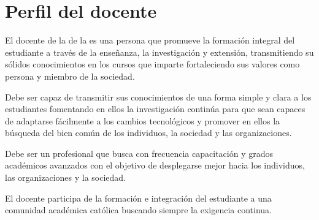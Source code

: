 \section{Perfil del docente}
El docente de la \SchoolFullName de la \University es una persona que promueve la formación 
integral del estudiante a través de la enseñanza, la investigación y extensión, 
transmitiendo su sólidos conocimientos en los cursos que imparte fortaleciendo sus valores como persona y miembro de la sociedad.

Debe ser capaz de transmitir sus conocimientos de una forma simple y clara a los estudiantes 
fomentando en ellos la investigación continúa para que sean capaces de adaptarse fácilmente a los 
cambios tecnológicos y promover en ellos la búsqueda del bien común de los individuos, la sociedad y 
las organizaciones.

Debe ser un profesional que busca con frecuencia capacitación y grados académicos avanzados con el objetivo de desplegarse mejor hacia los individuos, las organizaciones y la sociedad.

El docente participa de la formación e integración del estudiante a una comunidad académica católica buscando siempre la exigencia continua.